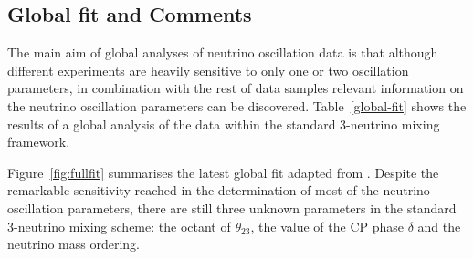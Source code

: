 \documentclass[english]{article}
\begin{document}
\subsection{Global fit and Comments}
	
    The main aim of global analyses of neutrino oscillation data is that although different experiments are heavily sensitive to only one or two oscillation parameters, in combination with the rest of data samples relevant information on the neutrino oscillation parameters can be discovered. Table~\ref{global-fit} shows the results of a global analysis of the data within the standard 3-neutrino mixing framework.
    
    Figure~\ref{fig:fullfit} summarises the latest global fit adapted from \cite{salas2018}. Despite the remarkable sensitivity reached in the determination of most of the neutrino oscillation parameters, there are still three unknown parameters in the standard 3-neutrino mixing scheme: the octant of $\theta_{23}$, the value of the CP phase $\delta$ and the neutrino mass ordering.
    
\end{document}

